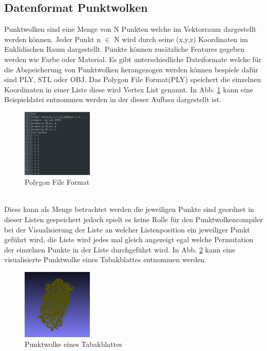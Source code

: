 \documentclass{llncs}
\begin{document}
\newpage
\subsection{Datenformat Punktwolken}\label{sec:punktwolken}

Punktwolken sind eine Menge von N Punkten welche im Vektorraum dargestellt werden können. Jeder Punkt n $\in$ N wird durch seine (x,y,z) Koordinaten im Euklidischen Raum dargestellt. Punkte können zusätzliche Features gegeben werden wie Farbe oder Material. Es gibt unterschiedliche Dateiformate welche für die Abspeicherung von Punktwolken herangezogen werden können bespiele dafür sind PLY, STL oder OBJ. Das Polygon File Format(PLY) speichert die einzelnen Koordinaten in einer Liste diese wird Vertex List genannt. In Abb. \ref{fig:Bild13} kann eine Beispieldatei entnommen werden in der dieser Aufbau dargestellt ist. 
\\
\begin{figure}[htbp] 
	\centering
	\includegraphics[width=0.3\textwidth]{plyexample.png}
	\caption{Polygon File Format}
	\label{fig:Bild13}
\end{figure}
\\
Diese kann als Menge betrachtet werden die jeweiligen Punkte sind geordnet in dieser Listen gespeichert jedoch spielt es keine Rolle für den Punktwolkencompiler bei der Visualisierung der Liste an welcher Listenposition ein jeweiliger Punkt geführt wird, die Liste wird jedes mal gleich angezeigt egal welche Permutation der einzelnen Punkte in der Liste durchgeführt wird. In Abb. \ref{fig:Bild12} kann eine visualisierte Punktwolke eines Tabakblattes entnommen werden. 
\\
\begin{figure}[htbp] 
	\centering
	\includegraphics[width=0.3\textwidth]{leaf1.png}
	\caption{Punktwolke eines Tabakblattes}
	\label{fig:Bild12}
\end{figure}
\newpage
\end{document}
